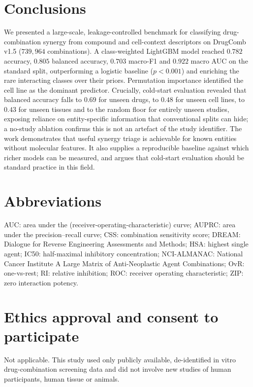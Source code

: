 \documentclass[11pt]{article}
\begin{document}
\section{Conclusions}
We presented a large-scale, leakage-controlled benchmark for classifying drug-combination synergy from
compound and cell-context descriptors on DrugComb v1.5 ($739{,}964$ combinations). A class-weighted
LightGBM model reached $0.782$ accuracy, $0.805$ balanced accuracy, $0.703$ macro-F1 and $0.922$ macro
AUC on the standard split, outperforming a logistic baseline ($p<0.001$) and enriching the rare
interacting classes over their priors. Permutation importance identified the cell line as the dominant
predictor. Crucially, cold-start evaluation revealed that balanced accuracy falls to $0.69$ for unseen
drugs, to $0.48$ for unseen cell lines, to $0.43$ for unseen tissues and to the random floor for
entirely unseen studies, exposing reliance on entity-specific information that conventional splits can
hide; a no-study ablation confirms this is not an artefact of the study identifier. The work
demonstrates that useful synergy triage is achievable for known entities without molecular features.
It also supplies a reproducible baseline against which richer models can be measured, and argues that
cold-start evaluation should be standard practice in this field.

\section*{Abbreviations}
AUC: area under the (receiver-operating-characteristic) curve; AUPRC: area under the precision--recall
curve; CSS: combination sensitivity score; DREAM: Dialogue for Reverse Engineering Assessments and
Methods; HSA: highest single agent; IC50: half-maximal inhibitory concentration; NCI-ALMANAC: National
Cancer Institute A Large Matrix of Anti-Neoplastic Agent Combinations; OvR: one-vs-rest; RI: relative
inhibition; ROC: receiver operating characteristic; ZIP: zero interaction potency.

\section*{Ethics approval and consent to participate}
Not applicable. This study used only publicly available, de-identified in vitro drug-combination
screening data and did not involve new studies of human participants, human tissue or animals.
\end{document}
